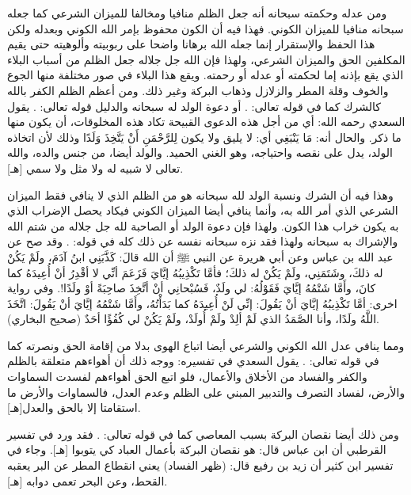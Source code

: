ومن عدله وحكمته سبحانه أنه جعل الظلم منافيا ومخالفا للميزان الشرعي كما جعله سبحانه منافيا للميزان الكوني. فهذا فيه أن الكون محفوظ بإمر الله الكوني وبعدله ولكن هذا الحفظ والإستقرار إنما جعله الله برهانا واضحا على ربوبيته وألوهيته حتى يقيم المكلفين الحق والميزان الشرعي، ولهذا فإن الله جل جلاله جعل الظلم من أسباب البلاء الذي يقع بإذنه إما لحكمته أو عدله أو رحمته. ويقع هذا البلاء في صور مختلفة منها الجوع والخوف وقلة المطر والزلازل وذهاب البركة وغير ذلك. ومن أعظم الظلم الكفر بالله كالشرك كما في قوله تعالى: 
\quranayah*[31][13]{\footnotesize \surahname*[31]}. أو دعوة الولد له سبحانه والدليل قوله تعالى:
\quranayah*[19][88-91]{\footnotesize \surahname*[19]}. يقول السعدي رحمه الله: أي من أجل هذه الدعوى القبيحة تكاد هذه المخلوقات، أن يكون منها ما ذكر. والحال أنه: { مَا يَنْبَغِي } أي: لا يليق ولا يكون { لِلرَّحْمَنِ أَنْ يَتَّخِذَ وَلَدًا } وذلك لأن اتخاذه الولد، يدل على نقصه واحتياجه، وهو الغني الحميد. والولد أيضا، من جنس والده، والله تعالى لا شبيه له ولا مثل ولا سمي [هـ]. 

وهذا فيه أن الشرك ونسبة الولد لله سبحانه هو من الظلم الذي لا ينافي فقط الميزان الشرعي الذي أمر الله به، وأنما ينافي أيضا الميزان الكوني فيكاد يحصل الإضراب الذي به يكون خراب هذا الكون. ولهذا فإن دعوة الولد أو الصاحبة لله جل جلاله من شتم الله والإشراك به سبحانه ولهذا فقد نزه سبحانه نفسه عن ذلك كله في قوله:
\quranayah*[6][100-103]{\footnotesize \surahname*[19]}. وقد صح عن عبد الله بن عباس وعن أبي هريرة عن النبي ﷺ أن الله قالَ: كَذَّبَنِي ابنُ آدَمَ، ولَمْ يَكُنْ له ذلكَ، وشَتَمَنِي، ولَمْ يَكُنْ له ذلكَ؛ فأمَّا تَكْذِيبُهُ إيَّايَ فَزَعَمَ أنِّي لا أقْدِرُ أنْ أُعِيدَهُ كما كانَ، وأَمَّا شَتْمُهُ إيَّايَ فَقَوْلُهُ: لي ولَدٌ، فَسُبْحانِي أنْ أتَّخِذَ صاحِبَةً أوْ ولَدًا!. وفي رواية اخرى: أمَّا تَكْذِيبُهُ إيَّايَ أنْ يَقُولَ: إنِّي لَنْ أُعِيدَهُ كما بَدَأْتُهُ، وأَمَّا شَتْمُهُ إيَّايَ أنْ يَقُولَ: اتَّخَذَ اللَّهُ ولَدًا، وأنا الصَّمَدُ الذي لَمْ ألِدْ ولَمْ أُولَدْ، ولَمْ يَكُنْ لي كُفُؤًا أحَدٌ {\footnotesize (صحيح البخاري)}.

ومما ينافي عدل الله الكوني والشرعي أيضا اتباع الهوى بدلا من إقامة الحق ونصرته كما في قوله تعالى:
\quranayah*[23][71]{\footnotesize \surahname*[23]}. يقول السعدي في تفسيره:
ووجه ذلك أن أهواءهم متعلقة بالظلم والكفر والفساد من الأخلاق والأعمال، فلو اتبع الحق أهواءهم لفسدت السماوات والأرض، لفساد التصرف والتدبير المبني على الظلم وعدم العدل، فالسماوات والأرض ما استقامتا إلا بالحق والعدل[هـ].

ومن ذلك أيضا نقصان البركة بسبب المعاصي كما في قوله تعالى:
\quranayah*[30][41]{\footnotesize \surahname*[30]}. فقد ورد في تفسير القرطبي أن ابن عباس قال: هو نقصان البركة بأعمال العباد كي يتوبوا [هـ]. وجاء في تفسير ابن كثير أن زيد بن رفيع قال: (ظهر الفساد) يعني انقطاع المطر عن البر يعقبه القحط، وعن البحر تعمى دوابه [هـ]. 


